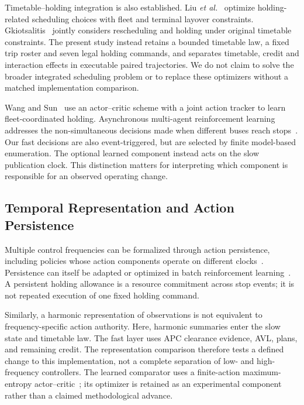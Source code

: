Timetable--holding integration is also established. Liu \emph{et al.}~\cite{liu2018integrated} optimize holding-related scheduling choices with fleet and terminal layover constraints. Gkiotsalitis~\cite{gkiotsalitis2021rescheduling} jointly considers rescheduling and holding under original timetable constraints. The present study instead retains a bounded timetable law, a fixed trip roster and seven legal holding commands, and separates timetable, credit and interaction effects in executable paired trajectories. We do not claim to solve the broader integrated scheduling problem or to replace these optimizers without a matched implementation comparison.

Wang and Sun~\cite{wang2020dynamic} use an actor--critic scheme with a joint action tracker to learn fleet-coordinated holding. Asynchronous multi-agent reinforcement learning addresses the non-simultaneous decisions made when different buses reach stops~\cite{wang2021asynchronous}. Our fast decisions are also event-triggered, but are selected by finite model-based enumeration. The optional learned component instead acts on the slow publication clock. This distinction matters for interpreting which component is responsible for an observed operating change.

\subsection{Temporal Representation and Action Persistence}
Multiple control frequencies can be formalized through action persistence, including policies whose action components operate on different clocks~\cite{lee2020multiple}. Persistence can itself be adapted or optimized in batch reinforcement learning~\cite{metelli2020persistence}. A persistent holding allowance is a resource commitment across stop events; it is not repeated execution of one fixed holding command.

Similarly, a harmonic representation of observations is not equivalent to frequency-specific action authority. Here, harmonic summaries enter the slow state and timetable law. The fast layer uses APC clearance evidence, AVL, plans, and remaining credit. The representation comparison therefore tests a defined change to this implementation, not a complete separation of low- and high-frequency controllers. The learned comparator uses a finite-action maximum-entropy actor--critic~\cite{haarnoja2018sac,christodoulou2019discrete}; its optimizer is retained as an experimental component rather than a claimed methodological advance.
